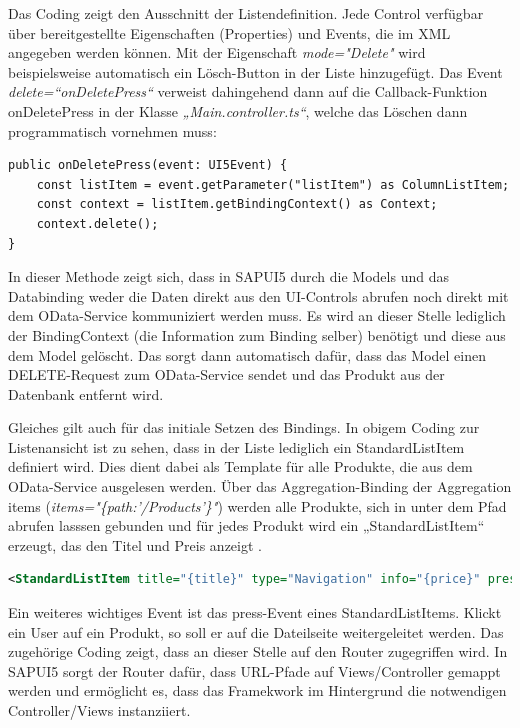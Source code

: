 Das Coding zeigt den Ausschnitt der Listendefinition. Jede Control verfügbar über bereitgestellte Eigenschaften (Properties) und Events, die im XML angegeben werden können. Mit der Eigenschaft \textit{mode="Delete"} wird beispielsweise automatisch ein Lösch-Button in der Liste hinzugefügt. Das Event \textit{delete=“onDeletePress“} verweist dahingehend dann auf die Callback-Funktion onDeletePress in der Klasse \textit{„Main.controller.ts“}, welche das Löschen dann programmatisch vornehmen muss:

\begin{lstlisting}[emph={event, UI5Event, listItem}]
public onDeletePress(event: UI5Event) {
    const listItem = event.getParameter("listItem") as ColumnListItem;
    const context = listItem.getBindingContext() as Context;
    context.delete();
} 
\end{lstlisting}

In dieser Methode zeigt sich, dass in SAPUI5 durch die Models und das Databinding weder die Daten direkt aus den UI-Controls abrufen noch direkt mit dem OData-Service kommuniziert werden muss. Es wird an dieser Stelle lediglich der BindingContext (die Information zum Binding selber) benötigt und diese aus dem Model gelöscht. Das sorgt dann automatisch dafür, dass das Model einen DELETE-Request zum OData-Service sendet und das Produkt aus der Datenbank entfernt wird.

Gleiches gilt auch für das initiale Setzen des Bindings. In obigem Coding zur Listenansicht ist zu sehen, dass in der Liste lediglich ein StandardListItem definiert wird. Dies dient dabei als Template für alle Produkte, die aus dem OData-Service ausgelesen werden. Über das Aggregation-Binding der Aggregation items (\textit{items="\{path:'/Products'\}"}) werden alle Produkte, sich in unter dem Pfad abrufen lasssen gebunden und für jedes Produkt wird ein „StandardListItem“ erzeugt, das den Titel und Preis anzeigt \cite{sud:s19}.

\begin{lstlisting}[language=XML]
<StandardListItem title="{title}" type="Navigation" info="{price}" press="onItemPress"/>
\end{lstlisting}

Ein weiteres wichtiges Event ist das press-Event eines StandardListItems. Klickt ein User auf ein Produkt, so soll er auf die Dateilseite weitergeleitet werden. Das zugehörige Coding zeigt, dass an dieser Stelle auf den Router zugegriffen wird. In SAPUI5 sorgt der Router dafür, dass URL-Pfade auf Views/Controller gemappt werden und ermöglicht es, dass das Framekwork im Hintergrund die notwendigen Controller/Views instanziiert.

